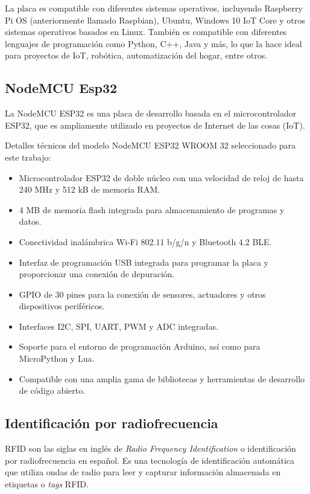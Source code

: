 La placa es compatible con diferentes sistemas operativos, incluyendo Raspberry Pi OS (anteriormente llamado Raspbian), Ubuntu, Windows 10 IoT Core y otros sistemas operativos basados en Linux. También es compatible con diferentes lenguajes de programación como Python, C++, Java y más, lo que la hace ideal para proyectos de IoT, robótica, automatización del hogar, entre otros.

\subsection{NodeMCU Esp32}
\label{subsec:esp32}

La NodeMCU ESP32 \cite{ESP32-DOC} es una placa de desarrollo basada en el microcontrolador ESP32, que es ampliamente utilizado en proyectos de Internet de las cosas (IoT). 

Detalles técnicos del modelo NodeMCU ESP32 WROOM 32 seleccionado para este trabajo:

\begin{itemize}
\item Microcontrolador ESP32 de doble núcleo con una velocidad de reloj de hasta 240 MHz y 512 kB de memoria RAM.
\item 4 MB de memoria flash integrada para almacenamiento de programas y datos.
\item Conectividad inalámbrica Wi-Fi 802.11 b/g/n y Bluetooth 4.2 BLE.
\item Interfaz de programación USB integrada para programar la placa y proporcionar una conexión de depuración.
\item GPIO de 30 pines para la conexión de sensores, actuadores y otros dispositivos periféricos.
\item Interfaces I2C, SPI, UART, PWM y ADC integradas.
\item Soporte para el entorno de programación Arduino, así como para MicroPython y Lua.
\item Compatible con una amplia gama de bibliotecas y herramientas de desarrollo de código abierto.
\end{itemize}

\subsection{Identificación por radiofrecuencia}
\label{subsec:rfid}

RFID \cite{RFID} son las siglas en inglés de \textit{Radio Frequency Identification} o identificación por radiofrecuencia en español. Es una tecnología de identificación automática que utiliza ondas de radio para leer y capturar información almacenada en etiquetas o \textit{tags} RFID.

